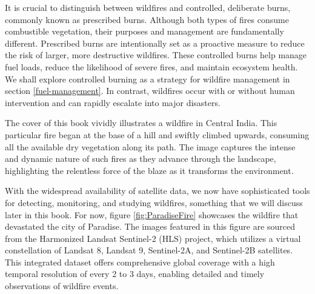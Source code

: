 \documentclass[
  12 pt,
]{Nemilov}
\begin{document}
It is crucial to distinguish between wildfires and controlled, deliberate burns, commonly known as prescribed burns. Although both types of fires consume combustible vegetation, their purposes and management are fundamentally different. Prescribed burns are intentionally set as a proactive measure to reduce the risk of larger, more destructive wildfires. These controlled burns help manage fuel loads, reduce the likelihood of severe fires, and maintain ecosystem health. We shall explore controlled burning as a strategy for wildfire management in section \ref{fuel-management}. In contrast, wildfires occur with or without human intervention and can rapidly escalate into major disasters.

The cover of this book vividly illustrates a wildfire in Central India. This particular fire began at the base of a hill and swiftly climbed upwards, consuming all the available dry vegetation along its path. The image captures the intense and dynamic nature of such fires as they advance through the landscape, highlighting the relentless force of the blaze as it transforms the environment.

With the widespread availability of satellite data, we now have sophisticated tools for detecting, monitoring, and studying wildfires, something that we will discuss later in this book. For now, figure \ref{fig:ParadiseFire} showcases the wildfire that devastated the city of Paradise. The images featured in this figure are sourced from the Harmonized Landsat Sentinel-2 (HLS) project, which utilizes a virtual constellation of Landsat 8, Landsat 9, Sentinel-2A, and Sentinel-2B satellites. This integrated dataset offers comprehensive global coverage with a high temporal resolution of every 2 to 3 days, enabling detailed and timely observations of wildfire events.
\end{document}
